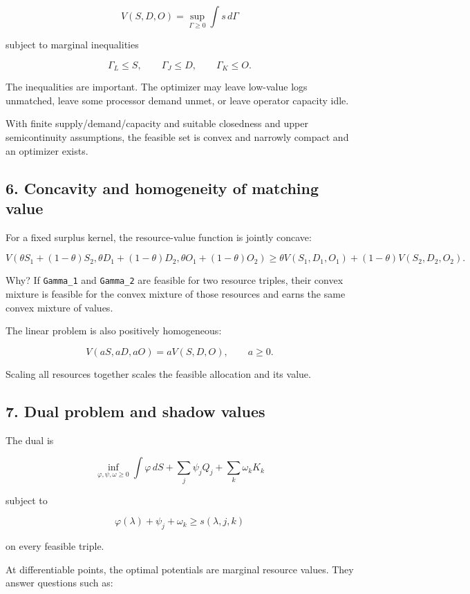 \[
V(S,D,O)=\sup_{\Gamma\ge0}\int s\,d\Gamma
\]

subject to marginal inequalities

\[
\Gamma_L\le S,\qquad \Gamma_J\le D,\qquad \Gamma_K\le O.
\]

The inequalities are important. The optimizer may leave low-value logs
unmatched, leave some processor demand unmet, or leave operator capacity idle.

With finite supply/demand/capacity and suitable closedness and upper
semicontinuity assumptions, the feasible set is convex and narrowly compact and
an optimizer exists.

\subsection{6. Concavity and homogeneity of matching value}\label{concavity-and-homogeneity-of-matching-value}

For a fixed surplus kernel, the resource-value function is jointly concave:

\[
V(\theta S_1+(1-\theta)S_2,
  \theta D_1+(1-\theta)D_2,
  \theta O_1+(1-\theta)O_2)
\ge
\theta V(S_1,D_1,O_1)+(1-\theta)V(S_2,D_2,O_2).
\]

Why? If \texttt{Gamma\_1} and \texttt{Gamma\_2} are feasible for two resource triples, their
convex mixture is feasible for the convex mixture of those resources and earns
the same convex mixture of values.

The linear problem is also positively homogeneous:

\[
V(aS,aD,aO)=aV(S,D,O),\qquad a\ge0.
\]

Scaling all resources together scales the feasible allocation and its value.

\subsection{7. Dual problem and shadow values}\label{dual-problem-and-shadow-values}

The dual is

\[
\inf_{\varphi,\psi,\omega\ge0}
\int\varphi\,dS+\sum_j\psi_jQ_j+\sum_k\omega_kK_k
\]

subject to

\[
\varphi(\lambda)+\psi_j+\omega_k
\ge s(\lambda,j,k)
\]

on every feasible triple.

At differentiable points, the optimal potentials are marginal resource values.
They answer questions such as:

